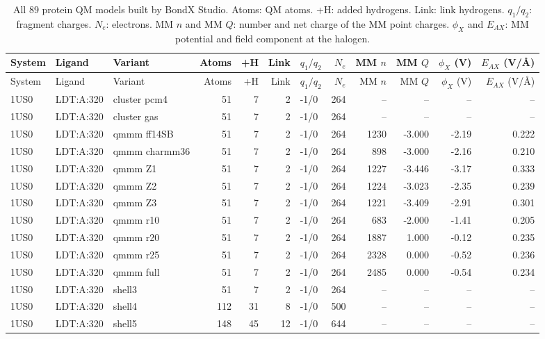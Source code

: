 \documentclass[journal=jcisd8,manuscript=suppinfo]{achemso}
\newcommand{\BX}{BondX Studio}
\begin{document}
\begin{singlespace}
{\scriptsize
\setlength{\tabcolsep}{3pt}
\begin{longtable}{lllrrrlrrrrr}
\caption{All 89 protein QM models built by \BX{}. Atoms: QM atoms. +H: added hydrogens. Link: link hydrogens. $q_1/q_2$: fragment charges. $N_e$: electrons. MM $n$ and MM $Q$: number and net charge of the MM point charges. $\phi_X$ and $E_{AX}$: MM potential and field component at the halogen.}\label{tab:models}\\
\toprule
System & Ligand & Variant & Atoms & +H & Link & $q_1/q_2$ & $N_e$ & MM $n$ & MM $Q$ & $\phi_X$ (V) & $E_{AX}$ (V/\AA)\\
\midrule
\endfirsthead
\toprule
System & Ligand & Variant & Atoms & +H & Link & $q_1/q_2$ & $N_e$ & MM $n$ & MM $Q$ & $\phi_X$ (V) & $E_{AX}$ (V/\AA)\\
\midrule
\endhead
\bottomrule
\endlastfoot
1US0 & LDT:A:320 & cluster pcm4 & 51 & 7 & 2 & -1/0 & 264 & -- & -- & -- & --\\
1US0 & LDT:A:320 & cluster gas & 51 & 7 & 2 & -1/0 & 264 & -- & -- & -- & --\\
1US0 & LDT:A:320 & qmmm ff14SB & 51 & 7 & 2 & -1/0 & 264 & 1230 & -3.000 & -2.19 & 0.222\\
1US0 & LDT:A:320 & qmmm charmm36 & 51 & 7 & 2 & -1/0 & 264 & 898 & -3.000 & -2.16 & 0.210\\
1US0 & LDT:A:320 & qmmm Z1 & 51 & 7 & 2 & -1/0 & 264 & 1227 & -3.446 & -3.17 & 0.333\\
1US0 & LDT:A:320 & qmmm Z2 & 51 & 7 & 2 & -1/0 & 264 & 1224 & -3.023 & -2.35 & 0.239\\
1US0 & LDT:A:320 & qmmm Z3 & 51 & 7 & 2 & -1/0 & 264 & 1221 & -3.409 & -2.91 & 0.301\\
1US0 & LDT:A:320 & qmmm r10 & 51 & 7 & 2 & -1/0 & 264 & 683 & -2.000 & -1.41 & 0.205\\
1US0 & LDT:A:320 & qmmm r20 & 51 & 7 & 2 & -1/0 & 264 & 1887 & 1.000 & -0.12 & 0.235\\
1US0 & LDT:A:320 & qmmm r25 & 51 & 7 & 2 & -1/0 & 264 & 2328 & 0.000 & -0.52 & 0.236\\
1US0 & LDT:A:320 & qmmm full & 51 & 7 & 2 & -1/0 & 264 & 2485 & 0.000 & -0.54 & 0.234\\
1US0 & LDT:A:320 & shell3 & 51 & 7 & 2 & -1/0 & 264 & -- & -- & -- & --\\
1US0 & LDT:A:320 & shell4 & 112 & 31 & 8 & -1/0 & 500 & -- & -- & -- & --\\
1US0 & LDT:A:320 & shell5 & 148 & 45 & 12 & -1/0 & 644 & -- & -- & -- & --\\

\end{longtable}}
\end{singlespace}
\end{document}
